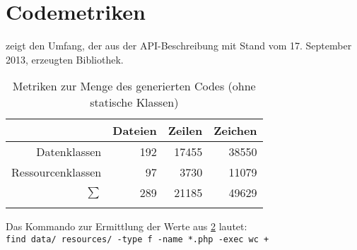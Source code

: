 \section{Codemetriken}
\label{sec:codemetrics}

 zeigt den Umfang, der aus der \gls{API}-Beschreibung mit Stand vom 17. September 2013, erzeugten Bibliothek.

\begin{table}
    \begin{longtable}{r r r r}
        \toprule
        \rowcolor{lightgray}
                          & \textbf{Dateien}  & \textbf{Zeilen}     & \textbf{Zeichen}\\
        \midrule
        Datenklassen      & 192               & 17455               & 38550\\
        Ressourcenklassen & 97                & 3730                & 11079\\        
        \midrule
        $\sum$            & 289               & 21185               & 49629\\
        \bottomrule
        \caption{Metriken zur Menge des generierten Codes (ohne statische Klassen)}
        \label{tab:code_metrics}
    \end{longtable} 
\end{table}

Das Kommando zur Ermittlung der Werte aus \cref{tab:code_metrics} lautet:\\
\texttt{find data/ resources/ -type f -name *.php -exec wc {} +}
